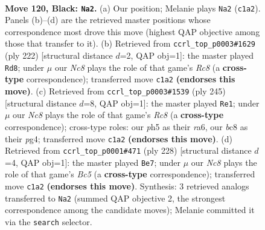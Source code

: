 \documentclass[11pt]{article}
\begin{document}
\clearpage

\begin{figure}[p]\centering
\begin{subfigure}{0.46\textwidth}\centering
\resizebox{\linewidth}{!}{%
\newchessgame
\chessboard[
  setfen={2B5/6k1/8/6PP/8/8/7K/2n5 b - - 10 120},
  showmover=false,
  pgfstyle=straightmove, color=movearrow, markmove={c1-a2}
]}
\caption{}
\end{subfigure}\hfill
\begin{subfigure}{0.46\textwidth}\centering
\resizebox{\linewidth}{!}{%
\newchessgame
\chessboard[
  setfen={2R5/8/6b1/4k3/8/5pp1/8/5K2 w - - 74 112},
  showmover=false,
  pgfstyle=straightmove, color=movearrow, markmove={c8-d8}
]}
\caption{}
\end{subfigure}
\\[4pt]
\begin{subfigure}{0.46\textwidth}\centering
\resizebox{\linewidth}{!}{%
\newchessgame
\chessboard[
  setfen={8/6k1/R7/6P1/6P1/8/6K1/2r5 b - - 20 123},
  showmover=false,
  pgfstyle=straightmove, color=movearrow, markmove={c1-e1}
]}
\caption{}
\end{subfigure}\hfill
\begin{subfigure}{0.46\textwidth}\centering
\resizebox{\linewidth}{!}{%
\newchessgame
\chessboard[
  setfen={8/8/6p1/2B5/4k1p1/2b5/6K1/8 w - - 62 115},
  showmover=false,
  pgfstyle=straightmove, color=movearrow, markmove={c5-e7}
]}
\caption{}
\end{subfigure}
\caption{\textbf{Move 120, Black: \texttt{Na2}.} (a) Our position; Melanie plays \texttt{Na2} (\texttt{c1a2}). Panels (b)--(d) are the retrieved master positions whose correspondence most drove this move (highest QAP objective among those that transfer to it). (b) Retrieved from \texttt{ccrl\_top\_p0003\#1629} (ply 222) [structural distance $d$=2, QAP obj=1]: the master played \texttt{Rd8}; under $\mu$ our \emph{Nc8} plays the role of that game's \emph{Rc8} (a \textbf{cross-type} correspondence); transferred move \texttt{c1a2} \textbf{(endorses this move)}. (c) Retrieved from \texttt{ccrl\_top\_p0003\#1539} (ply 245) [structural distance $d$=8, QAP obj=1]: the master played \texttt{Re1}; under $\mu$ our \emph{Nc8} plays the role of that game's \emph{Rc8} (a \textbf{cross-type} correspondence); cross-type roles: our \emph{p}h5 as their \emph{r}a6, our \emph{b}c8 as their \emph{p}g4; transferred move \texttt{c1a2} \textbf{(endorses this move)}. (d) Retrieved from \texttt{ccrl\_top\_p0001\#471} (ply 228) [structural distance $d$=4, QAP obj=1]: the master played \texttt{Be7}; under $\mu$ our \emph{Nc8} plays the role of that game's \emph{Bc5} (a \textbf{cross-type} correspondence); transferred move \texttt{c1a2} \textbf{(endorses this move)}. Synthesis: 3 retrieved analogs transferred to \texttt{Na2} (summed QAP objective 2, the strongest correspondence among the candidate moves); Melanie committed it via the \texttt{search} selector.}
\label{fig:thought-m239}
\end{figure}
\end{document}

